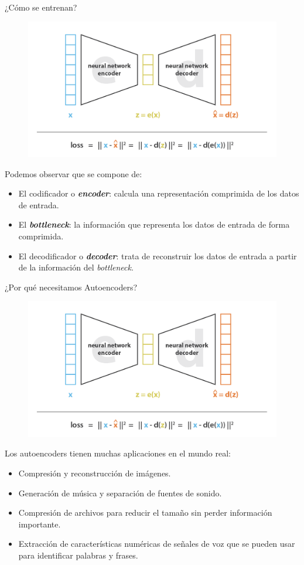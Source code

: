 \begin{frame}{¿Cómo se entrenan?}
\begin{figure}
    \centering
    \includegraphics[width=.6\textwidth]{Slides/figures/02_Metodos_Generativos/cnn-ae-loss.png}
\end{figure}

Podemos observar que se compone de:
\begin{itemize}
    \item El codificador o \textit{\textbf{encoder}}: calcula una representación comprimida de los datos de entrada.
    \item El \textbf{\textit{bottleneck}}: la información que representa los datos de entrada de forma comprimida.
    \item El decodificador o \textit{\textbf{decoder}}: trata de reconstruir los datos de entrada a partir de la información del \textit{bottleneck}.
\end{itemize}
\end{frame}


\begin{frame}{¿Por qué necesitamos Autoencoders?}

\begin{figure}
    \centering
    \includegraphics[width=.6\textwidth]{Slides/figures/02_Metodos_Generativos/cnn-ae-loss.png}
\end{figure}

Los autoencoders tienen muchas aplicaciones en el mundo real:

\begin{itemize}
    \item Compresión y reconstrucción de imágenes.
    \item Generación de música y separación de fuentes de sonido.
    \item Compresión de archivos para reducir el tamaño sin perder información importante.
    \item Extracción de características numéricas de señales de voz que se pueden usar para identificar palabras y frases.
\end{itemize}
\end{frame}


